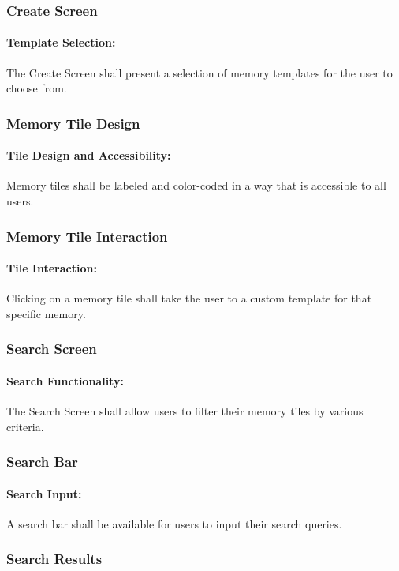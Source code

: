 \documentclass{article}
\begin{document}
\subsubsection*{Create Screen}
\addtocounter{subsubsection}{1}
\paragraph{Template Selection:} The Create Screen shall present a selection of memory templates for the user to choose from.
\subsubsection*{Memory Tile Design}
\addtocounter{subsubsection}{1}
\paragraph{Tile Design and Accessibility:} Memory tiles shall be labeled and color-coded in a way that is accessible to all users.
\subsubsection*{Memory Tile Interaction}
\addtocounter{subsubsection}{1}
\paragraph{Tile Interaction:} Clicking on a memory tile shall take the user to a custom template for that specific memory.
\subsubsection*{Search Screen}
\addtocounter{subsubsection}{1}
\paragraph{Search Functionality:} The Search Screen shall allow users to filter their memory tiles by various criteria.
\subsubsection*{Search Bar}
\addtocounter{subsubsection}{1}
\paragraph{Search Input:} A search bar shall be available for users to input their search queries.
\subsubsection*{Search Results}
\addtocounter{subsubsection}{1}
\end{document}
